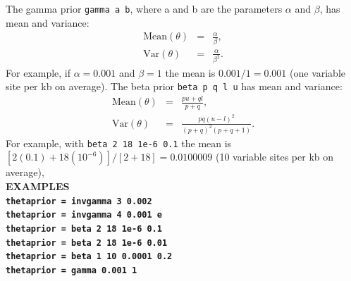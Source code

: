 \documentclass{book}
\numberwithin{equation}{section} \renewcommand{\baselinestretch}{0.55}
\begin{document}
The gamma prior \texttt{gamma a b}, where a and b are the parameters $\alpha$ and $\beta$,
has mean and variance:
\begin{eqnarray}
  \textrm{Mean}(\theta) & = & \frac{\alpha}{\beta}, \nonumber \\
  \textrm{Var}(\theta) & = & \frac{\alpha}{\beta^2}. \nonumber
\end{eqnarray}
For example, if $\alpha=0.001$ and $\beta=1$ the mean is $0.001/1 = 0.001$ (one
variable site per kb on average).
The beta prior \texttt{beta p q l u} has mean and variance:
\begin{eqnarray}
  \textrm{Mean}(\theta) & = & \frac{p u + q l}{p + q}, \nonumber \\
  \textrm{Var}(\theta) & = & \frac{p q (u - l)^2}{(p + q)^2 (p + q + 1)}. \nonumber                              
\end{eqnarray}
For example, with \texttt{beta 2 18 1e-6 0.1} the mean is
$[2(0.1)+18(10^{-6})]/[2+18] = 0.0100009$ (10 variable sites per kb on average),
\vspace{5pt}\\
\textbf{EXAMPLES} \vspace{5pt}\\
\textbf{\texttt{thetaprior = invgamma 3 0.002}} \vspace{5pt}\\
\textbf{\texttt{thetaprior = invgamma 4 0.001 e}}\vspace{5pt}\\
\textbf{\texttt{thetaprior = beta 2 18 1e-6 0.1}}\vspace{5pt}\\
\textbf{\texttt{thetaprior = beta 2 18 1e-6 0.01}}\vspace{5pt}\\
\textbf{\texttt{thetaprior = beta 1 10 0.0001 0.2}}\vspace{5pt}\\
\textbf{\texttt{thetaprior = gamma 0.001 1}}\vspace{10pt}\\
\end{document}
